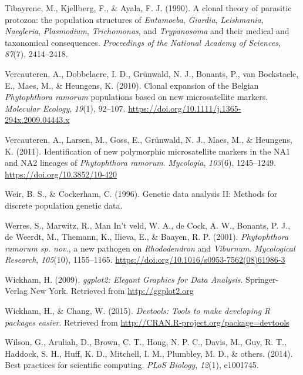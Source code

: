 \documentclass[double,11pt]{beavtex}
\begin{document}
  \hypertarget{ref-tibayrenc1990clonal}{}
  Tibayrenc, M., Kjellberg, F., \& Ayala, F. J. (1990). A clonal theory of
  parasitic protozoa: the population structures of \emph{Entamoeba},
  \emph{Giardia}, \emph{Leishmania}, \emph{Naegleria}, \emph{Plasmodium},
  \emph{Trichomonas}, and \emph{Trypanosoma} and their medical and
  taxonomical consequences. \emph{Proceedings of the National Academy of
  Sciences}, \emph{87}(7), 2414--2418.
  
  \hypertarget{ref-vercauteren2010clonal}{}
  Vercauteren, A., Dobbelaere, I. D., Grünwald, N. J., Bonants, P., van
  Bockstaele, E., Maes, M., \& Heungens, K. (2010). Clonal expansion of
  the Belgian \emph{Phytophthora ramorum} populations based on new
  microsatellite markers. \emph{Molecular Ecology}, \emph{19}(1), 92--107.
  \url{https://doi.org/10.1111/j.1365-294x.2009.04443.x}
  
  \hypertarget{ref-vercauteren2011identification}{}
  Vercauteren, A., Larsen, M., Goss, E., Grünwald, N. J., Maes, M., \&
  Heungens, K. (2011). Identification of new polymorphic microsatellite
  markers in the NA1 and NA2 lineages of \emph{Phytophthora ramorum}.
  \emph{Mycologia}, \emph{103}(6), 1245--1249.
  \url{https://doi.org/10.3852/10-420}
  
  \hypertarget{ref-weir1996genetic}{}
  Weir, B. S., \& Cockerham, C. (1996). Genetic data analysis II: Methods
  for discrete population genetic data.
  
  \hypertarget{ref-werres2001phytophthora}{}
  Werres, S., Marwitz, R., Man In't veld, W. A., de Cock, A. W., Bonants,
  P. J., de Weerdt, M., Themann, K., Ilieva, E., \& Baayen, R. P. (2001).
  \emph{Phytophthora ramorum sp. nov.}, a new pathogen on
  \emph{Rhododendron} and \emph{Viburnum}. \emph{Mycological Research},
  \emph{105}(10), 1155--1165.
  \url{https://doi.org/10.1016/s0953-7562(08)61986-3}
  
  \hypertarget{ref-wickham2009ggplot2}{}
  Wickham, H. (2009). \emph{ggplot2: Elegant Graphics for Data Analysis}.
  Springer-Verlag New York. Retrieved from \url{http://ggplot2.org}
  
  \hypertarget{ref-wickham2015devtools}{}
  Wickham, H., \& Chang, W. (2015). \emph{Devtools: Tools to make
  developing R packages easier}. Retrieved from
  \url{http://CRAN.R-project.org/package=devtools}
  
  \hypertarget{ref-wilson2014best}{}
  Wilson, G., Aruliah, D., Brown, C. T., Hong, N. P. C., Davis, M., Guy,
  R. T., Haddock, S. H., Huff, K. D., Mitchell, I. M., Plumbley, M. D., \&
  others. (2014). Best practices for scientific computing. \emph{PLoS
  Biology}, \emph{12}(1), e1001745.
  
\end{document}
